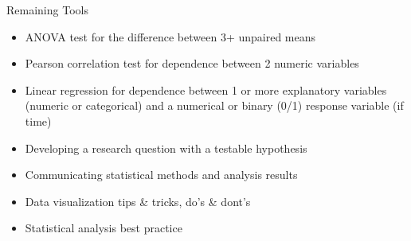 \documentclass[
  ignorenonframetext,
]{beamer}
\providecommand{\tightlist}{%
  \setlength{\itemsep}{0pt}\setlength{\parskip}{0pt}}\usepackage{longtable,booktabs,array}
\begin{document}
\begin{frame}{Remaining Tools}
\label{remaining-tools}
\begin{itemize}
\tightlist
\item
  ANOVA test for the difference between 3+ unpaired means
\end{itemize}

\pause

\begin{itemize}
\tightlist
\item
  Pearson correlation test for dependence between 2 numeric variables
\end{itemize}

\pause

\begin{itemize}
\tightlist
\item
  Linear regression for dependence between 1 or more explanatory
  variables (numeric or categorical) and a numerical or binary (0/1)
  response variable (if time)
\end{itemize}

\pause

\begin{itemize}
\tightlist
\item
  Developing a research question with a testable hypothesis
\end{itemize}

\pause

\begin{itemize}
\tightlist
\item
  Communicating statistical methods and analysis results
\end{itemize}

\pause

\begin{itemize}
\tightlist
\item
  Data visualization tips \& tricks, do's \& dont's
\end{itemize}

\pause

\begin{itemize}
\tightlist
\item
  Statistical analysis best practice
\end{itemize}
\end{frame}
\end{document}
